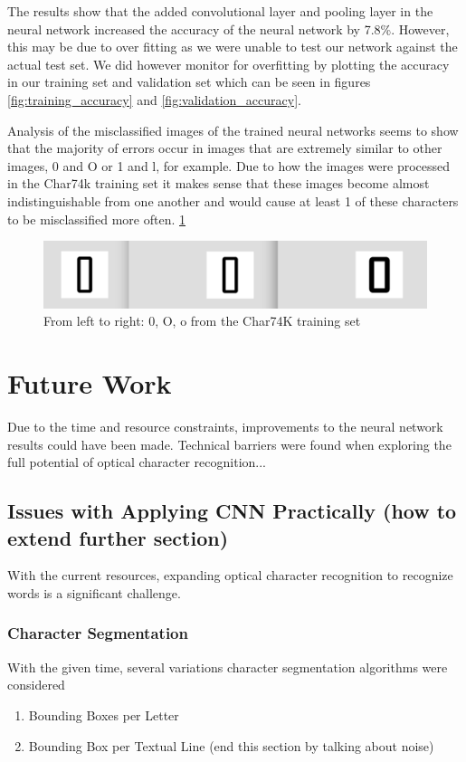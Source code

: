 \documentclass[11pt]{article}
\begin{document}
The results show that the added convolutional layer and pooling layer in the neural network increased the accuracy of the neural network by 7.8\%. However, this may be due to over fitting as we were unable to test our network against the actual test set. We did however monitor for overfitting by plotting the accuracy in our training set and validation set which can be seen in figures \ref{fig:training_accuracy} and \ref{fig:validation_accuracy}.

Analysis of the misclassified images of the trained neural networks seems to show that the majority of errors occur in images that are extremely similar to other images, 0 and O or 1 and l, for example. Due to how the images were processed in the Char74k training set it makes sense that these images become almost indistinguishable from one another and would cause at least 1 of these characters to be misclassified more often. \ref{fig:0Oo}

\begin{figure}
    \centering
    \includegraphics[scale=0.4]{0Oo.png}
    \caption{From left to right: 0, O, o from the Char74K training set}
    \label{fig:0Oo}
\end{figure}



\section{Future Work}
Due to the time and resource constraints, improvements to the neural network results could have been made.  Technical barriers were found when exploring the full potential of optical character recognition...



\subsection{Issues with Applying CNN Practically (how to extend further section)}
With the current resources, expanding optical character recognition to recognize words is a significant challenge.


\subsubsection{Character Segmentation}
With the given time, several variations character segmentation algorithms were considered
\begin{enumerate}
  \item Bounding Boxes per Letter
  \item Bounding Box per Textual Line (end this section by talking about noise)
\end{enumerate}
\end{document}
